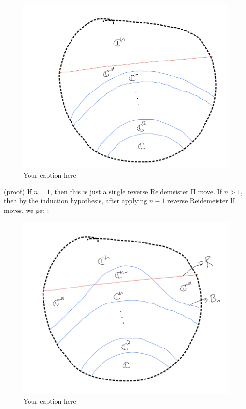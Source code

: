 \begin{figure}[H] %
    \centering
    \includegraphics[width=\linewidth]{diagrams/theorem13/2.png} %
    \caption{Your caption here}
    \label{fig:your-label}
\end{figure}
(proof) If $n=1$, then this is just a single reverse Reidemeister \RN{2} move. If $n>1$, then by the induction hypothesis, after applying $n-1$ reverse Reidemeister \RN{2} moves, we get :

\begin{figure}[H] %
    \centering
    \includegraphics[width=\linewidth]{diagrams/theorem13/3.png} %
    \caption{Your caption here}
    \label{fig:your-label}
\end{figure}


